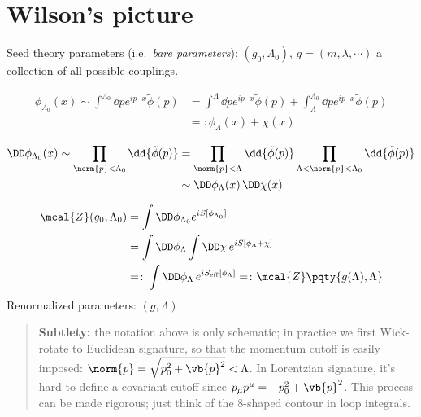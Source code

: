 \documentclass[a4paper,10pt]{article}
\begin{document}
\section{Wilson's picture}
	Seed theory parameters (i.e.\ \emph{bare parameters}):
	$(g_0,\Lambda_0)$, $g = (m,\lambda,\cdots)$ a collection of all
	possible couplings.
	
	\begin{equation}
	\begin{aligned}
	  \phi_{\Lambda_0}(x)
	  \sim \int^{\Lambda_0} \dd p
	    e^{ip\cdot x}
	    \tilde{\phi}(p)
	  &= \int^{\Lambda} \dd p
	    e^{ip\cdot x}
	    \tilde{\phi}(p)
	    + \int_{\Lambda}^{\Lambda_0} \dd p
	    e^{ip\cdot x}
	    \tilde{\phi}(p) \\
	  &=\colon \phi_{\Lambda}(x) + \chi(x)
	\end{aligned}
	\end{equation}
	
	\begin{equation}
	\begin{aligned}
	  \DD\phi_{\Lambda_0}(x)
	  \sim \prod_{\norm{p} < \Lambda_0}
	    \dd{\tilde{\phi}(p)}
	  &= \prod_{\norm{p} < \Lambda}
	    \dd{\tilde{\phi}(p)}
	    \prod_{\Lambda < \norm{p} < \Lambda_0}
	    \dd{\tilde{\phi}(p)} \\
	  &\sim
	    \DD\phi_{\Lambda}(x)\,
	    \DD\chi(x)
	\end{aligned}
	\end{equation}
	
	\begin{equation}
	\begin{aligned}
	  \mcal{Z} (g_0,\Lambda_0)
	  &= \int \DD \phi_{\Lambda_0}
	      e^{iS[\phi_{\Lambda_0}]} \\
	  &= \int \DD \phi_{\Lambda}
	    \int \DD \chi\,
	      e^{iS[\phi_\Lambda + \chi]} \\
	  &=\colon \int \DD \phi_{\Lambda}\,
	      e^{iS_{\mathrm{eff}} [\phi_\Lambda]}
	  =\colon \mcal{Z}\pqty{g(\Lambda),\Lambda}
	\end{aligned}
	\end{equation}
	Renormalized parameters: $(g,\Lambda)$.
	
	\begin{quote}
	\textbf{Subtlety:} the notation above is only schematic; in practice we
	first Wick-rotate to Euclidean signature, so that the momentum cutoff is
	easily imposed: $\norm{p} = \sqrt{p_0^2 + \vb{p}^2} < \Lambda$. In
	Lorentzian signature, it's hard to define a covariant cutoff since
	$p_\mu p^\mu = - p_0^2 + \vb{p}^2$. This process can be made rigorous;
	just think of the 8-shaped contour in loop integrals.
	\end{quote}
	
\end{document}
